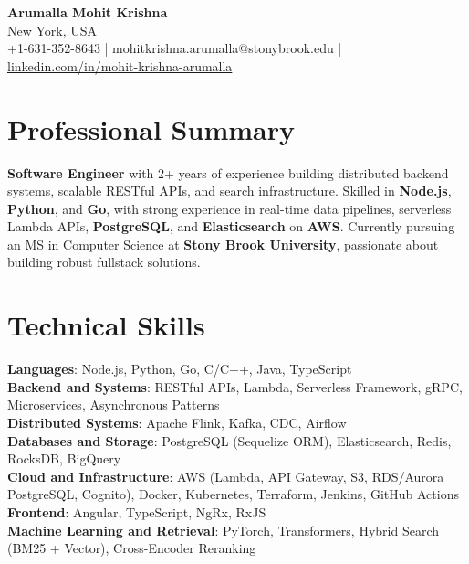 \documentclass[letterpaper,11pt]{article}
\begin{document}
\begin{center}
  {\Large \textbf{Arumalla Mohit Krishna}} \\
  New York, USA \\
  +1-631-352-8643 \enspace | \enspace mohitkrishna.arumalla@stonybrook.edu \enspace | \enspace \href{https://www.linkedin.com/in/mohit-krishna-arumalla}{linkedin.com/in/mohit-krishna-arumalla}
\end{center}

\section{Professional Summary}
  \begin{itemize}[leftmargin=0.15in, label={}]
    \small{\item{
     \textbf{Software Engineer} with 2+ years of experience building distributed backend systems, scalable RESTful APIs, and search infrastructure. Skilled in \textbf{Node.js}, \textbf{Python}, and \textbf{Go}, with strong experience in real-time data pipelines, serverless Lambda APIs, \textbf{PostgreSQL}, and \textbf{Elasticsearch} on \textbf{AWS}. Currently pursuing an MS in Computer Science at \textbf{Stony Brook University}, passionate about building robust fullstack solutions.
    }}
  \end{itemize}
\vspace{-16pt}

\section{Technical Skills}
 \begin{itemize}[leftmargin=0.15in, label={}]
    \small{\item{
     \textbf{Languages}: Node.js, Python, Go, C/C++, Java, TypeScript \\
     \textbf{Backend and Systems}: RESTful APIs, Lambda, Serverless Framework, gRPC, Microservices, Asynchronous Patterns \\
     \textbf{Distributed Systems}: Apache Flink, Kafka, CDC, Airflow \\
     \textbf{Databases and Storage}: PostgreSQL (Sequelize ORM), Elasticsearch, Redis, RocksDB, BigQuery \\
     \textbf{Cloud and Infrastructure}: AWS (Lambda, API Gateway, S3, RDS/Aurora PostgreSQL, Cognito), Docker, Kubernetes, Terraform, Jenkins, GitHub Actions \\
     \textbf{Frontend}: Angular, TypeScript, NgRx, RxJS \\
     \textbf{Machine Learning and Retrieval}: PyTorch, Transformers, Hybrid Search (BM25 + Vector), Cross-Encoder Reranking
    }}
 \end{itemize}
\vspace{-16pt}
\end{document}
